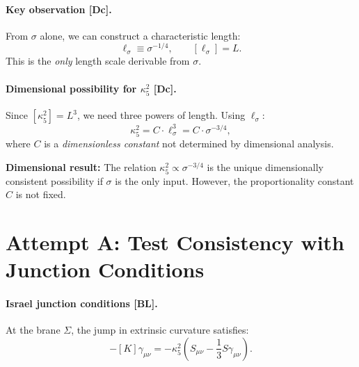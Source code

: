 \documentclass[11pt,a4paper]{article}
\newcommand{\tagBL}{\textcolor{blue!70!black}{[BL]}}
\newcommand{\tagDc}{\textcolor{purple!70!black}{[Dc]}}
\begin{document}
\paragraph{Key observation \tagDc{}.}
From $\sigma$ alone, we can construct a characteristic length:
\begin{equation}
    \ell_\sigma \equiv \sigma^{-1/4}, \qquad [\ell_\sigma] = L.
    \label{eq:ell_sigma}
\end{equation}
This is the \emph{only} length scale derivable from $\sigma$.

\paragraph{Dimensional possibility for $\kappa_5^2$ \tagDc{}.}
Since $[\kappa_5^2] = L^3$, we need three powers of length.
Using $\ell_\sigma$:
\begin{equation}
    \boxed{\kappa_5^2 = C \cdot \ell_\sigma^3 = C \cdot \sigma^{-3/4},}
    \label{eq:kappa5_dimensional}
\end{equation}
where $C$ is a \emph{dimensionless constant} not determined by dimensional analysis.

\begin{resultbox}
\textbf{Dimensional result:}
The relation $\kappa_5^2 \propto \sigma^{-3/4}$ is the unique dimensionally consistent possibility if $\sigma$ is the only input.
However, the proportionality constant $C$ is not fixed.
\end{resultbox}

\section{Attempt A: Test Consistency with Junction Conditions}
\label{sec:attempt_A}

\paragraph{Israel junction conditions \tagBL{}.}
At the brane $\Sigma$, the jump in extrinsic curvature satisfies:
\begin{equation}
    [K_{\mu\nu}] - [K] \gamma_{\mu\nu} = -\kappa_5^2 \left( S_{\mu\nu} - \frac{1}{3} S \gamma_{\mu\nu} \right).
    \label{eq:israel}
\end{equation}
\end{document}
